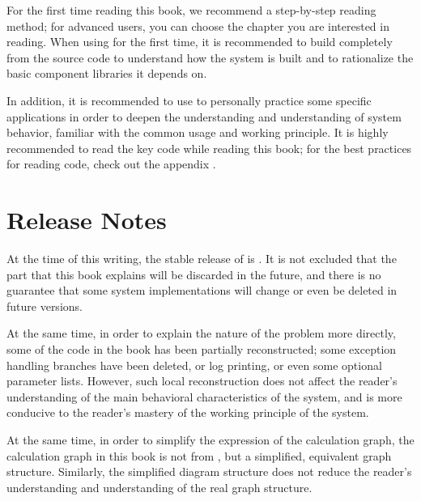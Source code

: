 \begin{content}

For the first time reading this book, we recommend a step-by-step reading method; for advanced users, you can choose the chapter you are interested in reading. When using  for the first time, it is recommended to build  completely from the source code to understand how the system is built and to rationalize the basic component libraries it depends on.

In addition, it is recommended to use  to personally practice some specific applications in order to deepen the understanding and understanding of  system behavior, familiar with the common  usage and working principle. It is highly recommended to read the  key code while reading this book; for the best practices for reading code, check out the appendix .

\end{content}

\section*{Release Notes}

\begin{content}

At the time of this writing, the stable release of  is . It is not excluded that the part  that this book explains will be discarded in the future, and there is no guarantee that some system implementations will change or even be deleted in future versions.

At the same time, in order to explain the nature of the problem more directly, some of the code in the book has been partially reconstructed; some exception handling branches have been deleted, or log printing, or even some optional parameter lists. However, such local reconstruction does not affect the reader's understanding of the main behavioral characteristics of the system, and is more conducive to the reader's mastery of the working principle of the system.

At the same time, in order to simplify the expression of the calculation graph, the calculation graph in this book is not from , but a simplified, equivalent graph structure. Similarly, the simplified diagram structure does not reduce the reader's understanding and understanding of the real graph structure.

\end{content}

